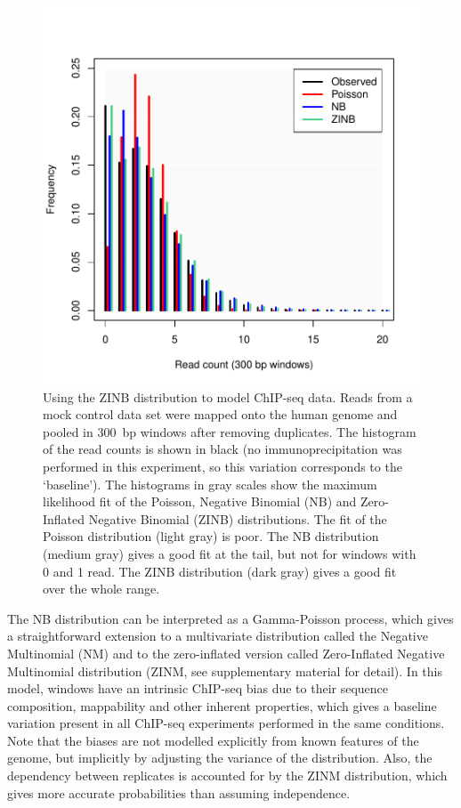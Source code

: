 \documentclass{bioinfo}
\begin{document}
\begin{methods}
\begin{figure}[!tpb]
\centerline{\includegraphics[scale=0.55]{ZINB_fit.pdf}}
\caption{
  Using the ZINB distribution to model ChIP-seq data. Reads from
  a mock control data set were mapped onto the human genome and
  pooled in 300~bp windows after removing duplicates. The histogram of
  the read counts is shown in black (no immunoprecipitation was
  performed in this experiment, so this variation corresponds to the
  `baseline'). The histograms in gray scales show the maximum
  likelihood fit of the Poisson, Negative Binomial (NB) and
  Zero-Inflated Negative Binomial (ZINB) distributions. The fit of
  the Poisson distribution (light gray) is poor. The NB distribution
  (medium gray) gives a good fit at the tail, but not for windows with
  0 and 1 read. The ZINB distribution (dark gray) gives a good fit
  over the whole range.
}\label{fig:ZINB_fit}
\end{figure}

The NB distribution can be interpreted as a Gamma-Poisson process,
which gives a straightforward extension to a multivariate
distribution called the Negative Multinomial (NM) and to the
zero-inflated version called Zero-Inflated Negative Multinomial
distribution (ZINM, see supplementary material for detail). In this
model, windows have an intrinsic ChIP-seq bias due to their sequence
composition, mappability and other inherent properties, which gives
a baseline variation present in all ChIP-seq experiments performed
in the same conditions. Note that the biases are not modelled explicitly
from known features of the genome, but implicitly by adjusting
the variance of the distribution. Also, the dependency between replicates
is accounted for by the ZINM distribution, which gives more accurate
probabilities than assuming independence.


\end{methods}
\end{document}
